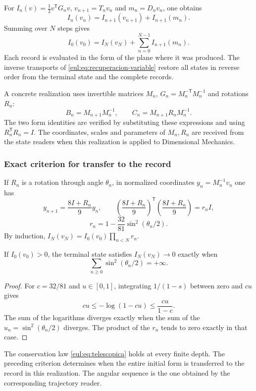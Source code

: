 For \(I_n(v)=\tfrac12v^\mathsf TG_nv\), \(v_{n+1}=T_nv_n\) and \(m_n=D_nv_n\), one obtains
\[
 I_n(v_n)=I_{n+1}(v_{n+1})+I_{n+1}(m_n).
\]
Summing over \(N\) steps gives
\begin{equation}
 I_0(v_0)=I_N(v_N)+\sum_{n=0}^{N-1}I_{n+1}(m_n).
\label{eul:eq:telescopica}
\end{equation}
Each record is evaluated in the form of the plane where it was produced. The inverse transports of \eqref{eul:eq:recuperacion-variable} restore all states in reverse order from the terminal state and the complete records.

A concrete realization uses invertible matrices \(M_n\), \(G_n=M_n^{-\mathsf T}M_n^{-1}\) and rotations \(R_n\):
\[
 B_n=M_{n+1}M_n^{-1},\qquad
 C_n=M_{n+1}R_nM_n^{-1}.
\]
The two form identities are verified by substituting these expressions and using \(R_n^\mathsf TR_n=I\). The coordinates, scales and parameters of \(M_n,R_n\) are received from the state readers when this realization is applied to Dimensional Mechanics.

\subsubsection{Exact criterion for transfer to the record}

If \(R_n\) is a rotation through angle \(\theta_n\), in normalized coordinates \(y_n=M_n^{-1}v_n\) one has
\[
 y_{n+1}=\frac{8I+R_n}{9}y_n,
 \qquad
 \left(\frac{8I+R_n}{9}\right)^\mathsf T
 \left(\frac{8I+R_n}{9}\right)=r_nI,
\]
\[
 r_n=1-\frac{32}{81}\sin^2(\theta_n/2).
\]
By induction, \(I_N(v_N)=I_0(v_0)\prod_{n<N}r_n\).

\begin{proposicion}
If \(I_0(v_0)>0\), the terminal state satisfies \(I_N(v_N)\to0\) exactly when
\[
 \sum_{n\ge0}\sin^2(\theta_n/2)=+\infty.
\]
\end{proposicion}
\begin{proof}
For \(c=32/81\) and \(u\in[0,1]\), integrating \(1/(1-s)\) between zero and \(cu\) gives
\[
 cu\le-\log(1-cu)\le\frac{cu}{1-c}.
\]
The sum of the logarithms diverges exactly when the sum of the \(u_n=\sin^2(\theta_n/2)\) diverges. The product of the \(r_n\) tends to zero exactly in that case.
\end{proof}

The conservation law \eqref{eul:eq:telescopica} holds at every finite depth. The preceding criterion determines when the entire initial form is transferred to the record in this realization. The angular sequence is the one obtained by the corresponding trajectory reader.

